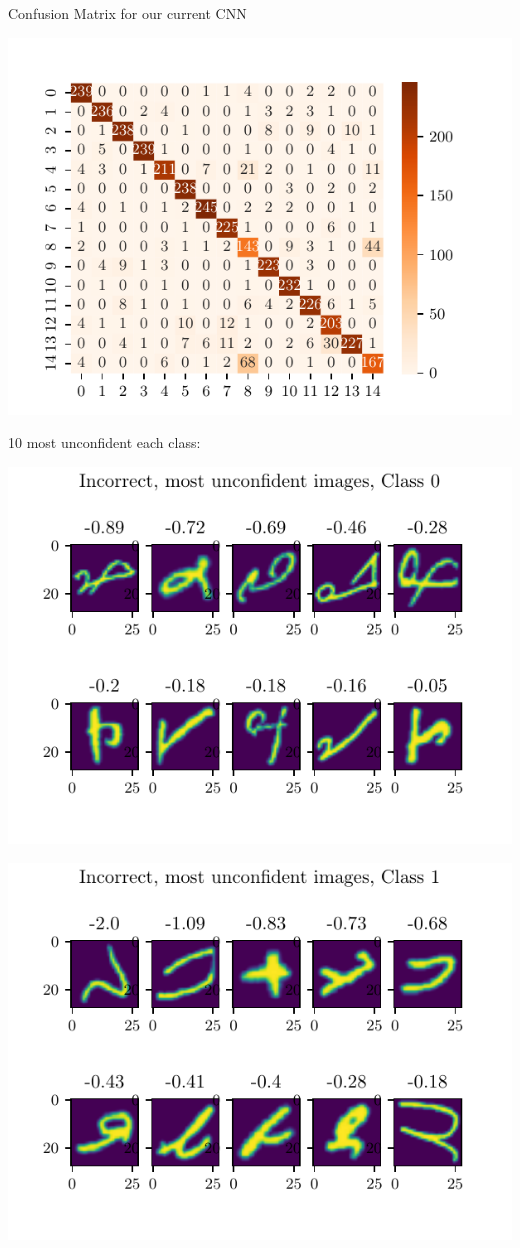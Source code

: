\documentclass[11pt]{article}
\begin{document}
Confusion Matrix for our current CNN

\includegraphics{figures/2d_confusion_matrix.pdf}

10 most unconfident each class:

\includegraphics{figures/2d_unconfident_imgs_class_0.pdf}

\includegraphics{figures/2d_unconfident_imgs_class_1.pdf}
\end{document}
